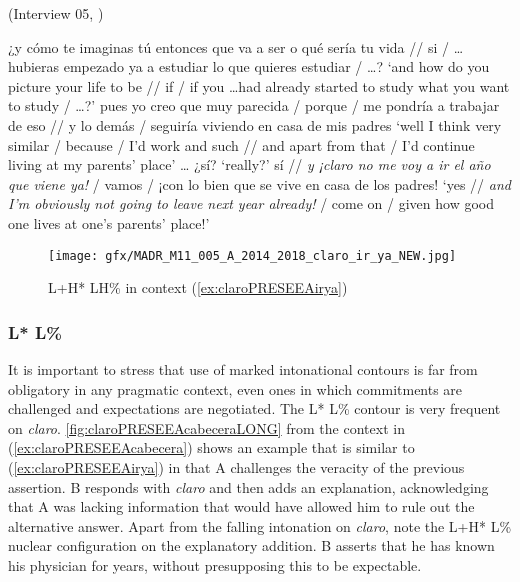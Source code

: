\begin{exe}
	\ex \label{ex:claroPRESEEAirya} (Interview 05, \cite{PRESEEA.20142020})
	\begin{xlist}[A:]
	 ¿y cómo te imaginas tú entonces que va a ser o qué sería tu vida // si / \ldots hubieras empezado ya a estudiar lo que quieres estudiar / \ldots?
	\glt `and how do you picture your life to be // if / if you \ldots had already started to study what you want to study / \ldots?'
	 pues yo creo que muy parecida / porque / me pondría a trabajar de eso // y lo demás / seguiría viviendo en casa de mis padres
	\glt `well I think very similar / because / I'd work and such // and apart from that / I'd continue living at my parents' place' \ldots
	 ¿sí? 
	\glt `really?'
	 sí // \textit{y ¡claro no me voy a ir el año que viene ya!} / vamos / ¡con lo bien que se vive en casa de los padres! 
	\glt `yes // \textit{and I'm obviously not going to leave next year already!} / come on / given how good one lives at one's parents' place!'
	\end{xlist}
\end{exe}

\begin{figure}
	\texttt{[image: gfx/MADR\_M11\_005\_A\_2014\_2018\_claro\_ir\_ya\_NEW.jpg]}
	\caption{L+H* LH\% in context (\ref{ex:claroPRESEEAirya}) \href{https://osf.io/tmzs7/}{\faVolumeUp} \label{fig:claroPRESEEAirya}}
\end{figure}
 
\subsubsection{L* L\%}

It is important to stress that use of marked intonational contours is far from obligatory in any pragmatic context, even ones in which commitments are challenged and expectations are negotiated. The L* L\% contour is very frequent on \textit{claro}. \autoref{fig:claroPRESEEAcabeceraLONG} from the context in (\ref{ex:claroPRESEEAcabecera}) shows an example that is similar to (\ref{ex:claroPRESEEAirya}) in that A challenges the veracity of the previous assertion. B responds with \textit{claro} and then adds an explanation, acknowledging that A was lacking information that would have allowed him to rule out the alternative answer. Apart from the falling intonation on \textit{claro}, note the L+H* L\% nuclear configuration on the explanatory addition. B asserts that he has known his physician for years, without presupposing this to be expectable.


